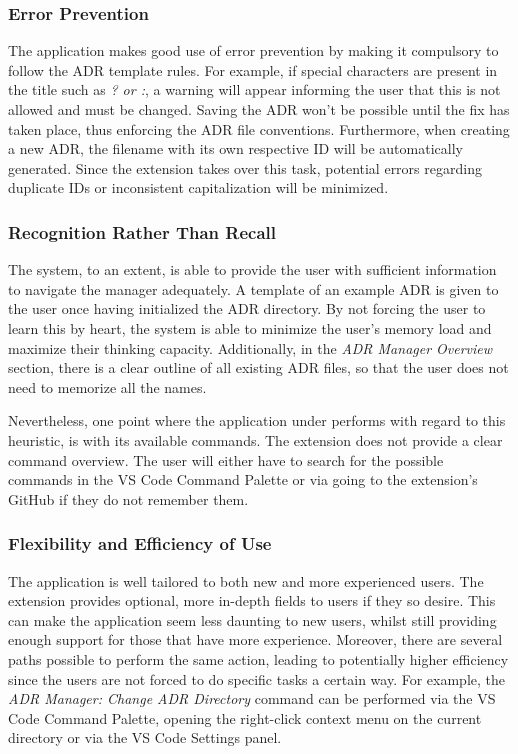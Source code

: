 \documentclass{article}
\begin{document}
\subsubsection{Error Prevention}
The application makes good use of error prevention by making it compulsory to follow the ADR template rules. For example, if special characters are present in the title such as \textit{? or :}, a warning will appear informing the user that this is not allowed and must be changed. Saving the ADR won't be possible until the fix has taken place, thus enforcing the ADR file conventions. Furthermore, when creating a new ADR, the filename with its own respective ID will be automatically generated. Since the extension takes over this task, potential errors regarding duplicate IDs or inconsistent capitalization will be minimized.

\subsubsection{Recognition Rather Than Recall}
The system, to an extent, is able to provide the user with sufficient information to navigate the manager adequately. A template of an example ADR is given to the user once having initialized the ADR directory. By not forcing the user to learn this by heart, the system is able to minimize the user's memory load and maximize their thinking capacity. Additionally, in the \textit{ADR Manager Overview} section, there is a clear outline of all existing ADR files, so that the user does not need to memorize all the names.

Nevertheless, one point where the application under performs with regard to this heuristic, is with its available commands. The extension does not provide a clear command overview. The user will either have to search for the possible commands in the VS Code Command Palette or via going to the extension's GitHub if they do not remember them.

\subsubsection{Flexibility and Efficiency of Use}
The application is well tailored to both new and more experienced users. The extension provides optional, more in-depth fields to users if they so desire. This can make the application seem less daunting to new users, whilst still providing enough support for those that have more experience. Moreover, there are several paths possible to perform the same action, leading to potentially higher efficiency since the users are not forced to do specific tasks a certain way. For example, the \textit{ADR Manager: Change ADR Directory} command can be performed via the VS Code Command Palette, opening the right-click context menu on the current directory or via the VS Code Settings panel.
\end{document}

